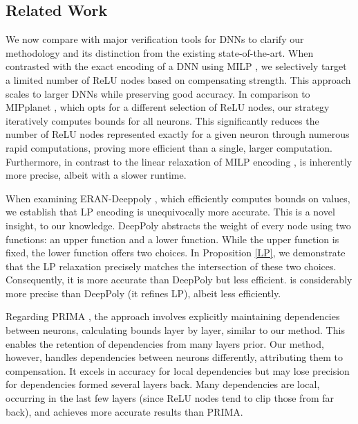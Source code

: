 \subsection{Related Work} 


We now compare {\CMP} with major verification tools for DNNs to clarify our methodology and its distinction from the existing state-of-the-art. When contrasted with the exact encoding of a DNN using MILP \cite{MILP}, we selectively target a limited number of ReLU nodes based on compensating strength. This approach scales to larger DNNs while preserving good accuracy. In comparison to MIPplanet \cite{MIPplanet}, which opts for a different selection of ReLU nodes, our strategy iteratively computes bounds for all neurons. This significantly reduces the number of ReLU nodes represented exactly for a given neuron through numerous rapid computations, proving more efficient than a single, larger computation. Furthermore, in contrast to the linear relaxation of MILP encoding \cite{MILP}, {\CMP} is inherently more precise, albeit with a slower runtime. 

When examining ERAN-Deeppoly \cite{deeppoly}, which efficiently computes bounds on values, we establish that LP encoding is unequivocally more accurate. This is a novel insight, to our knowledge. DeepPoly abstracts the weight of every node using two functions: an upper function and a lower function. While the upper function is fixed, the lower function offers two choices. In Proposition \ref{LP}, we demonstrate that the LP relaxation precisely matches the intersection of these two choices. Consequently, it is more accurate than DeepPoly but less efficient. \CMP is considerably more precise than DeepPoly (it refines LP), albeit less efficiently.

Regarding PRIMA \cite{prima}, the approach involves explicitly maintaining dependencies between neurons, calculating bounds layer by layer, similar to our method. This enables the retention of dependencies from many layers prior. Our method, however, handles dependencies between neurons differently, attributing them to compensation. It excels in accuracy for local dependencies but may lose precision for dependencies formed several layers back. Many dependencies are local, occurring in the last few layers (since ReLU nodes tend to clip those from far back), and \CMP achieves more accurate results than PRIMA.


